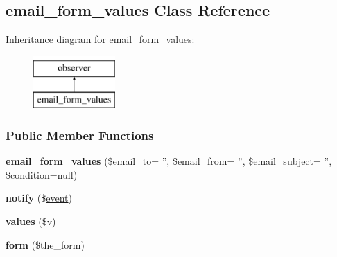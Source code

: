 \hypertarget{classemail__form__values}{\subsection{email\-\_\-form\-\_\-values Class Reference}
\label{classemail__form__values}
}
Inheritance diagram for email\-\_\-form\-\_\-values\-:\begin{figure}[H]
\begin{center}
\leavevmode
\includegraphics[height=2.000000cm]{classemail__form__values}
\end{center}
\end{figure}
\subsubsection*{Public Member Functions}
\begin{DoxyCompactItemize}
\item 
\hypertarget{classemail__form__values_a0f34f9d698413cced7d71f70e56bc2ae}{{\bfseries email\-\_\-form\-\_\-values} (\$email\-\_\-to= '', \$email\-\_\-from= '', \$email\-\_\-subject= '', \$condition=null)}\label{classemail__form__values_a0f34f9d698413cced7d71f70e56bc2ae}

\item 
\hypertarget{classemail__form__values_aa5aaf3b2f99af03834b3c12b04e3dd29}{{\bfseries notify} (\$\hyperlink{classevent}{event})}\label{classemail__form__values_aa5aaf3b2f99af03834b3c12b04e3dd29}

\item 
\hypertarget{classemail__form__values_ac366707f802e46865a9bf363c35f3841}{{\bfseries values} (\$v)}\label{classemail__form__values_ac366707f802e46865a9bf363c35f3841}

\item 
\hypertarget{classemail__form__values_a740b9cbf52273cdb99899964076aed64}{{\bfseries form} (\$the\-\_\-form)}\label{classemail__form__values_a740b9cbf52273cdb99899964076aed64}

\end{DoxyCompactItemize}
